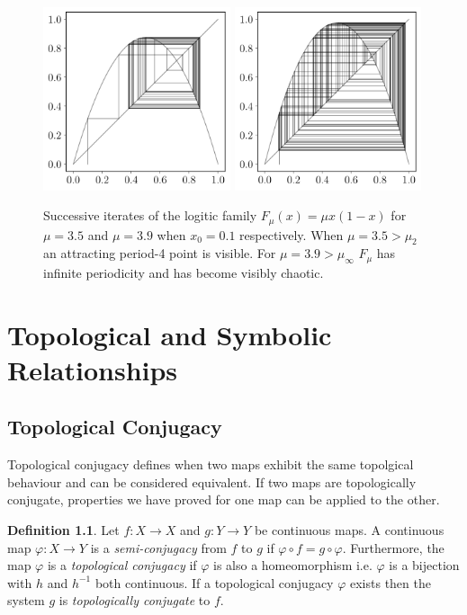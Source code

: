 \documentclass[11pt,a4paper,oneside]{memoir}
\theoremstyle{plain}
\theoremstyle{definition}
\newtheorem{defn}[thm]{Definition}
\begin{document}
\begin{figure}[h]
    \centering
    \includegraphics[width=5.5cm]{cobweb_0.1_3.5.pdf}
    \includegraphics[width=5.5cm]{cobweb_0.1_3.9.pdf}
    \caption{Successive iterates of the logitic family $F_{\mu}(x) = \mu x(1-x)$ for $\mu = 3.5$ and $\mu = 3.9$ when $x_0 = 0.1$ respectively. When $\mu = 3.5 > \mu_2$ an attracting period-4 point is visible. For $\mu = 3.9 > \mu_\infty$ $F_\mu$ has infinite periodicity and has become visibly chaotic.}
    \label{fig:cobweb_3.5_3.9}
\end{figure}

\chapter{Topological and Symbolic Relationships}

\section{Topological Conjugacy}
Topological conjugacy defines when two maps exhibit the same topolgical behaviour and can be considered equivalent. If two maps are topologically conjugate, properties we have proved for one map can be applied to the other.

\begin{defn}
    Let $f: X \to X$ and $g: Y \to Y$ be continuous maps. A continuous map $\varphi: X \to Y$ is a \emph{semi-conjugacy} from $f$ to $g$ if $\varphi \circ f = g \circ \varphi$. Furthermore, the map $\varphi$ is a \emph{topological conjugacy} if $\varphi$ is also a homeomorphism i.e. $\varphi$ is a bijection with $h$ and $h^{-1}$ both continuous. If a topological conjugacy $\varphi$ exists then the system $g$ is \emph{topologically conjugate} to $f$.
\end{defn}
\end{document}
